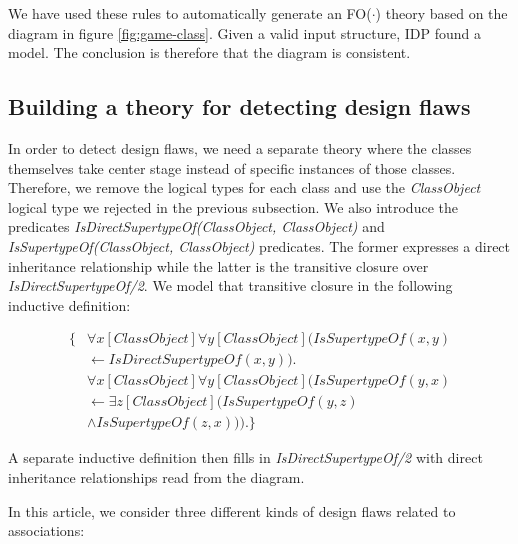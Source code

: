 \documentclass[conference]{IEEEtran}
\begin{document}
We have used these rules to automatically generate an FO($\cdot$) theory based on the diagram in figure \ref{fig:game-class}. Given a valid input structure, IDP found a model. The conclusion is therefore that the diagram is consistent.

\subsection{Building a theory for detecting design flaws}\label{sec:design-flaw}

In order to detect design flaws, we need a separate theory where the classes themselves take center stage instead of specific instances of those classes. Therefore, we remove the logical types for each class and use the \textit{ClassObject} logical type we rejected in the previous subsection. We also introduce the predicates \textit{IsDirectSupertypeOf(ClassObject, ClassObject)} and \textit{IsSupertypeOf(ClassObject, ClassObject)} predicates. The former expresses a direct inheritance relationship while the latter is the transitive closure over \textit{IsDirectSupertypeOf/2}. We model that transitive closure in the following inductive definition:

\begin{align*}
	\{ &\forall{x}[ClassObject]\forall{y}[ClassObject](IsSupertypeOf(x, y) \\ &\leftarrow IsDirectSupertypeOf(x, y)). \\
	&\forall{x}[ClassObject]\forall{y}[ClassObject](IsSupertypeOf(y, x) \\ &\leftarrow \exists{z}[ClassObject](IsSupertypeOf(y, z)  \\ &\land IsSupertypeOf(z, x))).\}
\end{align*}

A separate inductive definition then fills in \textit{IsDirectSupertypeOf/2} with direct inheritance relationships read from the diagram.

In this article, we consider three different kinds of design flaws related to associations:
\end{document}
